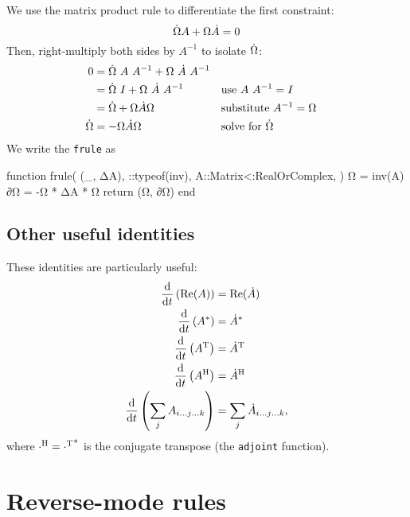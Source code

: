 \documentclass[../../main.tex]{subfiles}
\begin{document}
\begin{refsection}
We use the matrix product rule to differentiate the first constraint:
\[\dot{\Omega} A + \Omega \dot{A} = 0\]
Then, right-multiply both sides by $A^{-1}$ to isolate $\dot{\Omega}$:
\begin{align}
	0 & = \dot{\Omega}~ A~ A^{-1} + \Omega ~\dot{A}~ A^{-1} \nonumber                                                   \\
	  & = \dot{\Omega}~ I + \Omega ~\dot{A}~ A^{-1}
	  &                                                                 & \text{use } A~ A^{-1} = I \nonumber             \\
	  & = \dot{\Omega} + \Omega \dot{A} \Omega
	  &                                                                 & \text{substitute } A^{-1} = \Omega \nonumber    \\
	\dot{\Omega}
	  & = -\Omega \dot{A} \Omega
	  &                                                                 & \text{solve for } \dot{\Omega} \label{invdiff}
\end{align}
We write the \texttt{frule} as
\begin{juliacode}
function frule(
    (_, ΔA),
    ::typeof(inv),
    A::Matrix{<:RealOrComplex},
)
    Ω = inv(A)
    ∂Ω = -Ω * ΔA * Ω
    return (Ω, ∂Ω)
end
\end{juliacode}
\subsection{Other useful identities}\label{other-useful-identities}

These identities are particularly useful:
\begin{align*}
	\dv{t} \left( \Re(A) \right)                            & = \Re(\dot{A})    \\
	\dv{t} \left( {A}^* \right)                          & = {\dot{A}}^*  \\
	\dv{t} \left( {A}^\mathrm{T} \right)                         & = {\dot{A}}^\mathrm{T} \\
	\dv{t} \left( {A}^\mathrm{H} \right)                         & = {\dot{A}}^\mathrm{H} \\
	\dv{t} \left( \sum_{j}  A_{i \ldots j \ldots k} \right) & =
	\sum_{j} \dot{A}_{i \ldots j \ldots k},
\end{align*}
where ${\cdot}^\mathrm{H} = {{\cdot}^\mathrm{T}}^*$ is the conjugate transpose (the \texttt{adjoint} function).

\section{Reverse-mode rules}\label{reverse-mode-rules}


\end{refsection}
\end{document}
